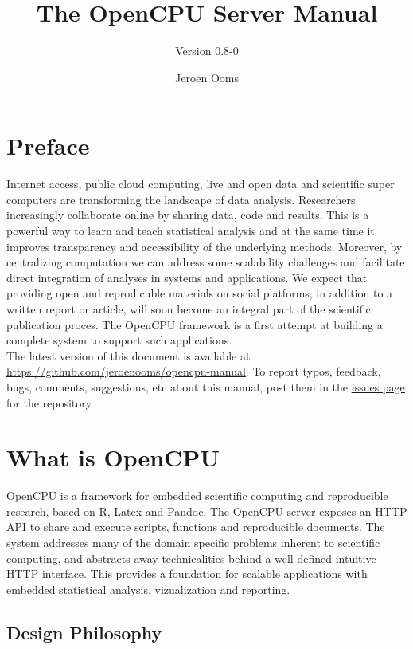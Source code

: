 \documentclass{scrartcl}\usepackage[]{graphicx}\usepackage[]{color}
\title{The OpenCPU Server Manual}
\subtitle{Version 0.8-0}
\author{Jeroen Ooms}
\begin{document}
\maketitle

\section*{Preface}

Internet access, public cloud computing, live and open data and scientific super computers are transforming the landscape of data analysis. Researchers increasingly collaborate online by sharing data, code and results. This is a powerful way to learn and teach statistical analysis and at the same time it improves transparency and accessibility of the underlying methods. Moreover, by centralizing computation we can address some scalability challenges and facilitate direct integration of analyses in systems and applications. We expect that providing open and reprodicuble materials on social platforms, in addition to a written report or article, will soon become an integral part of the scientific publication proces. The OpenCPU framework is a first attempt at building a complete system to support such applications. \\

\noindent The latest version of this document is available at \href{https://github.com/jeroenooms/opencpu-manual}{https://github.com/jeroenooms/opencpu-manual}. To report typos, feedback, bugs, comments, suggestions, etc about this manual, post them in the \href{https://github.com/jeroenooms/opencpu-manual/issues}{issues page} for the repository. 

\tableofcontents

\section{What is OpenCPU}

OpenCPU is a framework for embedded scientific computing and reproducible research, based on R, Latex and Pandoc. The OpenCPU server exposes an HTTP API to share and execute scripts, functions and reproducible documents. The system addresses many of the domain specific problems inherent to scientific computing, and abstracts away technicalities behind a well defined intuitive HTTP interface. This provides a foundation for scalable applications with embedded statistical analysis, vizualization and reporting. 

\subsection{Design Philosophy}
\end{document}
